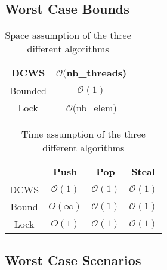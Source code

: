 \documentclass [10pt]{scrartcl}
\begin{document}
   
   \subsection{Worst Case Bounds}
   
   
   \begin{table}[h]
      \centering
      \begin{tabular}{c||c}
         \hline
         DCWS & $\mathcal{O}($nb\_threads) \\ \hline
         Bounded & $\mathcal{O}(1)$ \\ \hline
         Lock & $\mathcal{O}($nb\_elem)\\ \hline 
      \end{tabular}
      \caption{Space assumption of the three different algorithms }
      \label{tab:space}
   \end{table}
   
   
   \begin{table}[h]
      \centering
      \begin{tabular}{c||c|c|c}
         \hline
         & Push & Pop & Steal\\ \hline
         DCWS & $\mathcal{O}(1)$ & $\mathcal{O}(1)$ & $\mathcal{O}(1)$  \\ \hline
         Bound & $O(\infty)$ & $\mathcal{O}(1)$  & $\mathcal{O}(1)$ \\ \hline
         Lock &  $O(1)$ & $\mathcal{O}(1)$ & $\mathcal{O}(1)$ \\ \hline
      \end{tabular}
      \caption{Time assumption of the three different algorithms}
      \label{tab:wc}
   \end{table}
   
   \subsection{Worst Case Scenarios}
   
\end{document}
